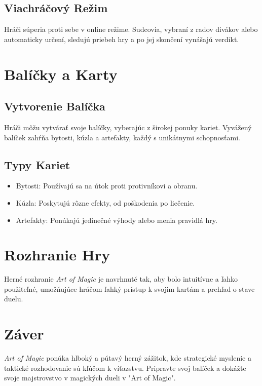 \documentclass[12pt]{article}
\begin{document}
\subsection{Viachráčový Režim}
Hráči súperia proti sebe v online režime. Sudcovia, vybraní z radov divákov alebo automaticky určení, sledujú priebeh hry a po jej skončení vynášajú verdikt.

\section{Balíčky a Karty}
\subsection*{Vytvorenie Balíčka}
Hráči môžu vytvárať svoje balíčky, vyberajúc z širokej ponuky kariet. Vyvážený balíček zahŕňa bytosti, kúzla a artefakty, každý s unikátnymi schopnosťami.

\subsection{Typy Kariet}
\begin{itemize}
    \item Bytosti: Používajú sa na útok proti protivníkovi a obranu.
    \item Kúzla: Poskytujú rôzne efekty, od poškodenia po liečenie.
    \item Artefakty: Ponúkajú jedinečné výhody alebo menia pravidlá hry.
\end{itemize}

\section{Rozhranie Hry}
Herné rozhranie \textit{Art of Magic} je navrhnuté tak, aby bolo intuitívne a ľahko použiteľné, umožňujúce hráčom ľahký prístup k svojim kartám a prehľad o stave duelu.

\section{Záver}
\textit{Art of Magic} ponúka hlboký a pútavý herný zážitok, kde strategické myslenie a taktické rozhodovanie sú kľúčom k víťazstvu. Pripravte svoj balíček a dokážte svoje majstrovstvo v magických dueli v "Art of Magic".

\newpage
\end{document}
